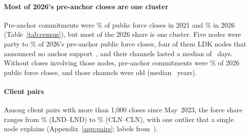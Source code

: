 \paragraph{Most of 2026's pre-anchor closes are one cluster}
Pre-anchor commitments were \PubLegacyPctTwentyOne\% of public force closes in 2021 and \PubLegacyPctTwentySix\% in
2026 (Table~\ref{tab:census}), but most of the 2026 share is one cluster. Five nodes were party to
\LegacyTopFivePct\% of 2026's pre-anchor public force closes, four of them LDK nodes that announced no anchor
support~\cite{kumar2026clientdiversity}, and their channels lasted a median of \LegacyClusterAgeDays~days. Without
closes involving those nodes, pre-anchor commitments were \LegacyPctExClusterTwentySix\% of 2026 public force closes,
and those channels were old (median \LegacyOldAgeYears~years).

\paragraph{Client pairs}
Among client pairs with more than 1,000 closes since May~2023, the force share ranges from \PairForcePctLndLnd\%
(LND--LND) to \PairForcePctClnCln\% (CLN--CLN), with one outlier that a single node explains
(Appendix~\ref{app:pairs}; labels from~\cite{kumar2026clientdiversity}).

